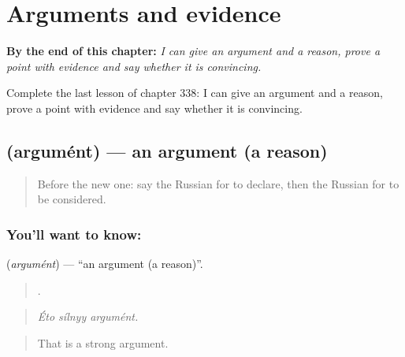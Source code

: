 
\chapter{Arguments and evidence}
\label{ch:ru-arguments-and-evidence}

\begin{chapteropening}
\textbf{By the end of this chapter:} \emph{I can give an argument and a reason, prove a point with evidence and say whether it is convincing.}

Complete the last lesson of chapter 338: I can give an argument and a reason, prove a point with evidence and say whether it is convincing.
\end{chapteropening}

\section[\texorpdfstring{\ru{аргумент} (argumént)}{аргумент (argumént)}]{ (argumént) — an argument (a reason)}

\label{lesson:RU-C338-argument}



\begin{quote}
Before the new one: say the Russian for to declare, then the Russian for to be considered.
\end{quote}

\subsection*{You'll want to know: }
\textbf{} (\emph{argumént}) — \textquotedblleft{}an argument (a reason)\textquotedblright{}.

\begin{quote}
  .
\end{quote}

\begin{quote}
\emph{Éto sílnyy argumént.}
\end{quote}

\begin{quote}
That is a strong argument.
\end{quote}

